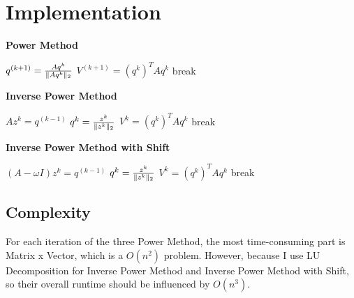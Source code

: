 \documentclass{article}
\DeclarePairedDelimiter{\norm}{\lVert}{\rVert}
\begin{document}
\section{Implementation}
\begin{algorithm}[H]
    \caption{\textbf{Power Method}}
    \begin{algorithmic}
            \State $q^{(k+1)} = \frac{Aq^k}{\norm{Aq^k}_2}$
            \State $V^{(k+1)} = (q^k)^TAq^k$
                \State break
            \EndIf
        \EndFor
    \end{algorithmic}
\end{algorithm}
\begin{algorithm}[H]
    \caption{\textbf{Inverse Power Method}}
    \begin{algorithmic}
            \State $Az^k = q^{(k-1)}$
            \State $q^k = \frac{z^k}{\norm{z^k}_2}$
            \State $V^k = (q^k)^TAq^k$
                \State break
            \EndIf
        \EndFor
    \end{algorithmic}
\end{algorithm}
\begin{algorithm}[H]
    \caption{\textbf{Inverse Power Method with Shift}}
    \begin{algorithmic}
            \State $(A - {\omega}I)z^k = q^{(k-1)}$
            \State $q^k = \frac{z^k}{\norm{z^k}_2}$
            \State $V^k = (q^k)^TAq^k$
                \State break
            \EndIf
        \EndFor
    \end{algorithmic}
\end{algorithm}
\subsection{Complexity}
\label{sec:complexity}
For each iteration of the three Power Method, the most time-consuming part is Matrix x Vector, which is a {\boldmath$O(n^2)$} problem. 
However, because I use LU Decomposition for Inverse Power Method and Inverse Power Method with Shift, so their overall runtime should be 
influenced by {\boldmath$O(n^3)$}.
\end{document}
